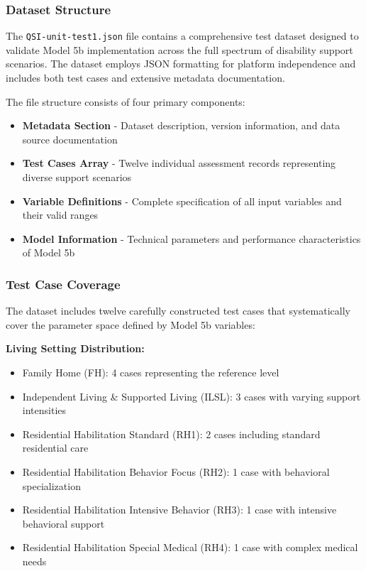\subsubsection{Dataset Structure}

The \texttt{QSI-unit-test1.json} file contains a comprehensive test dataset designed to validate Model 5b implementation across the full spectrum of disability support scenarios. The dataset employs JSON formatting for platform independence and includes both test cases and extensive metadata documentation.

The file structure consists of four primary components:

\begin{itemize}
    \item \textbf{Metadata Section} - Dataset description, version information, and data source documentation
    \item \textbf{Test Cases Array} - Twelve individual assessment records representing diverse support scenarios
    \item \textbf{Variable Definitions} - Complete specification of all input variables and their valid ranges
    \item \textbf{Model Information} - Technical parameters and performance characteristics of Model 5b
\end{itemize}

\subsubsection{Test Case Coverage}

The dataset includes twelve carefully constructed test cases that systematically cover the parameter space defined by Model 5b variables:

\textbf{Living Setting Distribution:}
\begin{itemize}
    \item Family Home (FH): 4 cases representing the reference level
    \item Independent Living \& Supported Living (ILSL): 3 cases with varying support intensities
    \item Residential Habilitation Standard (RH1): 2 cases including standard residential care
    \item Residential Habilitation Behavior Focus (RH2): 1 case with behavioral specialization
    \item Residential Habilitation Intensive Behavior (RH3): 1 case with intensive behavioral support
    \item Residential Habilitation Special Medical (RH4): 1 case with complex medical needs
\end{itemize}

